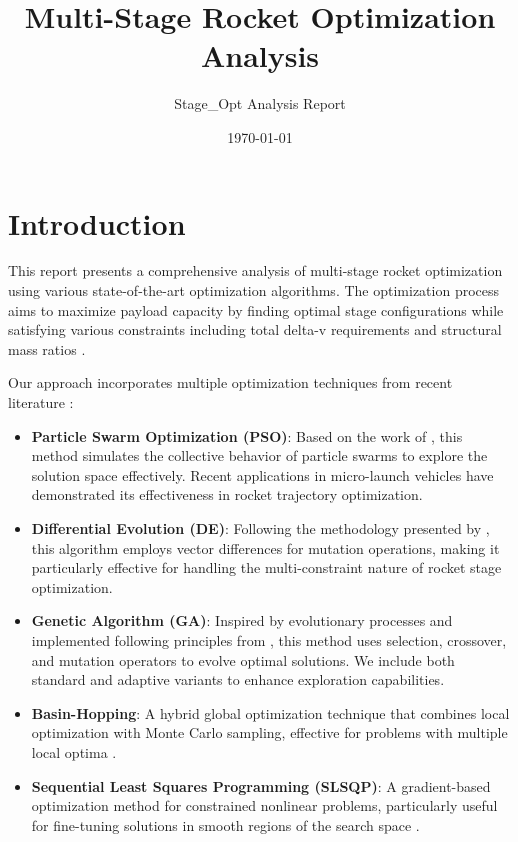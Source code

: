 \documentclass[11pt]{article}
\title{Multi-Stage Rocket Optimization Analysis}
\author{Stage\_Opt Analysis Report}
\date{\today}
\begin{document}
\maketitle

\section{Introduction}
This report presents a comprehensive analysis of multi-stage rocket optimization using various state-of-the-art optimization algorithms. The optimization process aims to maximize payload capacity by finding optimal stage configurations while satisfying various constraints including total delta-v requirements and structural mass ratios \cite{pso_ascent_2013}.

Our approach incorporates multiple optimization techniques from recent literature \cite{evolutionary_rocket_2022, de_ascent_2021}:

\begin{itemize}
    \item \textbf{Particle Swarm Optimization (PSO)}: Based on the work of \cite{pso_ascent_2013}, this method simulates the collective behavior of particle swarms to explore the solution space effectively. Recent applications in micro-launch vehicles \cite{pso_micro_launch_2012} have demonstrated its effectiveness in rocket trajectory optimization.
    
    \item \textbf{Differential Evolution (DE)}: Following the methodology presented by \cite{de_ascent_2021}, this algorithm employs vector differences for mutation operations, making it particularly effective for handling the multi-constraint nature of rocket stage optimization.
    
    \item \textbf{Genetic Algorithm (GA)}: Inspired by evolutionary processes and implemented following principles from \cite{evolutionary_rocket_2022}, this method uses selection, crossover, and mutation operators to evolve optimal solutions. We include both standard and adaptive variants to enhance exploration capabilities.
    
    \item \textbf{Basin-Hopping}: A hybrid global optimization technique that combines local optimization with Monte Carlo sampling, effective for problems with multiple local optima \cite{pso_micro_launch_2012}.
    
    \item \textbf{Sequential Least Squares Programming (SLSQP)}: A gradient-based optimization method for constrained nonlinear problems, particularly useful for fine-tuning solutions in smooth regions of the search space \cite{de_ascent_2021}.
\end{itemize}
\end{document}
